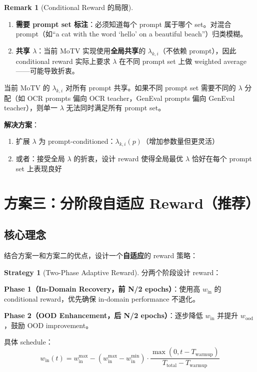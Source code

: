 \documentclass[11pt,a4paper]{article}
\theoremstyle{definition}
\newtheorem{remark}{Remark}
\newtheorem{strategy}{Strategy}
\begin{document}
\begin{remark}[Conditional Reward 的局限]
\begin{enumerate}[leftmargin=1.5em]
\item \textbf{需要 prompt set 标注}：必须知道每个 prompt 属于哪个 set。对混合 prompt（如``a cat with the word `hello' on a beautiful beach''）归类模糊。
\item \textbf{共享 $\lambda$}：当前 MoTV 实现使用\textbf{全局共享}的 $\lambda_{k,i}$（不依赖 prompt），因此 conditional reward 实际上要求 $\lambda$ 在不同 prompt set 上做 weighted average——可能导致折衷。
\end{enumerate}
\end{remark}

\begin{tcolorbox}[colback=orange!5, colframe=orange!50, title=关键洞察：全局 $\lambda$ 的限制]
当前 MoTV 的 $\lambda_{k,i}$ 对所有 prompt 共享。如果不同 prompt set 需要不同的 $\lambda$ 分配（如 OCR prompts 偏向 OCR teacher，GenEval prompts 偏向 GenEval teacher），则单一 $\lambda$ 无法同时满足所有 prompt set。

\textbf{解决方案}：
\begin{enumerate}
\item 扩展 $\lambda$ 为 prompt-conditioned：$\lambda_{k,i}(p)$（增加参数量但更灵活）
\item 或者：接受全局 $\lambda$ 的折衷，设计 reward 使得全局最优 $\lambda$ 恰好在每个 prompt set 上表现良好
\end{enumerate}
\end{tcolorbox}

\section{方案三：分阶段自适应 Reward（推荐）}
\label{sec:adaptive}

\subsection{核心理念}

结合方案一和方案二的优点，设计一个\textbf{自适应}的 reward 策略：

\begin{strategy}[Two-Phase Adaptive Reward]
\label{strat:adaptive}
分两个阶段设计 reward：

\textbf{Phase 1（In-Domain Recovery，前 N/2 epochs）}：使用高 $w_{\mathrm{in}}$ 的 conditional reward，优先确保 in-domain performance 不退化。

\textbf{Phase 2（OOD Enhancement，后 N/2 epochs）}：逐步降低 $w_{\mathrm{in}}$ 并提升 $w_{\mathrm{ood}}$，鼓励 OOD improvement。

具体 schedule：
\begin{equation}
w_{\mathrm{in}}(t) = w_{\mathrm{in}}^{\max} - (w_{\mathrm{in}}^{\max} - w_{\mathrm{in}}^{\min})\cdot \frac{\max(0, t - T_{\mathrm{warmup}})}{T_{\mathrm{total}} - T_{\mathrm{warmup}}}
\end{equation}
\end{strategy}
\end{document}
